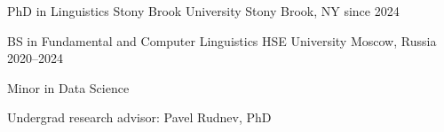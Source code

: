 

\begin{cventries}

  \cventry
    {PhD in Linguistics} %
    {Stony Brook University} %
    {Stony Brook, NY} %
    {since 2024} %
    {
      \begin{cvitems} %
      \end{cvitems}
    }

  \cventry
    {BS in Fundamental and Computer Linguistics} %
    {HSE University} %
    {Moscow, Russia} %
    {2020--2024} %
    {
      \begin{cvitems} %
        \item {Minor in Data Science}
        \item {Undergrad research advisor: Pavel Rudnev, PhD}
      \end{cvitems}
    }

\end{cventries}
